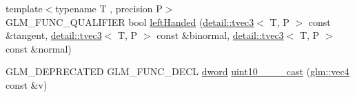 \begin{DoxyCompactItemize}
\item 
{\footnotesize template$<$typename T , precision P$>$ }\\G\-L\-M\-\_\-\-F\-U\-N\-C\-\_\-\-Q\-U\-A\-L\-I\-F\-I\-E\-R bool \hyperlink{group__gtx__handed__coordinate__space_ga2c0882af0eabd0e39da5680931f586ed}{left\-Handed} (\hyperlink{structglm_1_1detail_1_1tvec3}{detail\-::tvec3}$<$ T, P $>$ const \&tangent, \hyperlink{structglm_1_1detail_1_1tvec3}{detail\-::tvec3}$<$ T, P $>$ const \&binormal, \hyperlink{structglm_1_1detail_1_1tvec3}{detail\-::tvec3}$<$ T, P $>$ const \&normal)
\item 
\hypertarget{namespaceglm_ac9ff752cfc08f478e19615228e3e19fc}{G\-L\-M\-\_\-\-D\-E\-P\-R\-E\-C\-A\-T\-E\-D G\-L\-M\-\_\-\-F\-U\-N\-C\-\_\-\-D\-E\-C\-L \hyperlink{group__gtx__raw__data_ga1fc2589df6d44e923cd1820cf14805cf}{dword} \hyperlink{namespaceglm_ac9ff752cfc08f478e19615228e3e19fc}{uint10\-\_\-\_\-\_\-\_\-cast} (\hyperlink{group__core__types_ga5881b1b022d7fd1b7218f5916532dd02}{glm\-::vec4} const \&v)}\label{namespaceglm_ac9ff752cfc08f478e19615228e3e19fc}


\end{DoxyCompactItemize}
